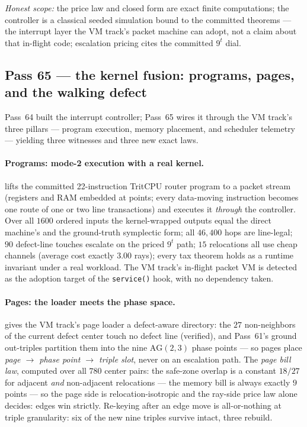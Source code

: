 \documentclass[11pt]{article}
\begin{document}
\emph{Honest scope:} the price law and closed form are exact finite
computations; the controller is a classical seeded simulation bound to the
committed theorems --- the interrupt layer the VM track's packet machine can
adopt, not a claim about that in-flight code; escalation pricing cites the
committed \(9^t\) dial.

\subsection{Pass 65 --- the kernel fusion: programs, pages, and the walking defect}
\label{sec:capstone-sixtyfive}

Pass~64 built the interrupt controller; Pass~65 wires it through the VM
track's three pillars --- program execution, memory placement, and scheduler
telemetry --- yielding three witnesses and three new exact laws.

\paragraph{Programs: mode-2 execution with a real kernel.}
 lifts the committed 22-instruction
TritCPU router program to a packet stream (registers and RAM embedded at
points; every data-moving instruction becomes one route of one or two line
transactions) and executes it \emph{through} the controller.  Over all
\(1600\) ordered inputs the kernel-wrapped outputs equal the direct machine's
and the ground-truth symplectic form; all \(46{,}400\) hops are line-legal;
\(90\) defect-line touches escalate on the priced \(9^t\) path; \(15\)
relocations all use cheap channels (average cost exactly \(3.00\) rays); every
tax theorem holds as a runtime invariant under a real workload.  The VM
track's in-flight packet VM is detected as the adoption target of the
\texttt{service()} hook, with no dependency taken.

\paragraph{Pages: the loader meets the phase space.}
 gives the VM track's page loader
a defect-aware directory: the \(27\) non-neighbors of the current defect
center touch no defect line (verified), and Pass~61's ground out-triples
partition them into the nine \(\mathrm{AG}(2,3)\) phase points --- so pages
place \emph{page \(\to\) phase point \(\to\) triple slot}, never on an
escalation path.  The \emph{page bill law}, computed over all \(780\) center
pairs: the safe-zone overlap is a constant \(18/27\) for adjacent \emph{and}
non-adjacent relocations --- the memory bill is always exactly \(9\) points ---
so the page side is relocation-isotropic and the ray-side price law alone
decides: edges win strictly.  Re-keying after an edge move is all-or-nothing
at triple granularity: six of the new nine triples survive intact, three
rebuild.
\end{document}
